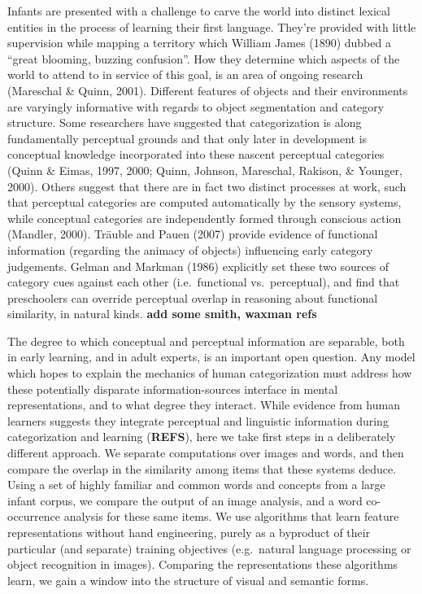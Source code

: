 \documentclass[10pt, letterpaper]{article}
\begin{document}
Infants are presented with a challenge to carve the world into distinct
lexical entities in the process of learning their first language.
They're provided with little supervision while mapping a territory which
William James (1890) dubbed a ``great blooming, buzzing confusion''. How
they determine which aspects of the world to attend to in service of
this goal, is an area of ongoing research (Mareschal \& Quinn, 2001).
Different features of objects and their environments are varyingly
informative with regards to object segmentation and category structure.
Some researchers have suggested that categorization is along
fundamentally perceptual grounds and that only later in development is
conceptual knowledge incorporated into these nascent perceptual
categories (Quinn \& Eimas, 1997, 2000; Quinn, Johnson, Mareschal,
Rakison, \& Younger, 2000). Others suggest that there are in fact two
distinct processes at work, such that perceptual categories are computed
automatically by the sensory systems, while conceptual categories are
independently formed through conscious action (Mandler, 2000). Träuble
and Pauen (2007) provide evidence of functional information (regarding
the animacy of objects) influencing early category judgements. Gelman
and Markman (1986) explicitly set these two sources of category cues
against each other (i.e.~functional vs.~perceptual), and find that
preschoolers can override perceptual overlap in reasoning about
functional similarity, in natural kinds. \textbf{add some smith, waxman
refs}

The degree to which conceptual and perceptual information are separable,
both in early learning, and in adult experts, is an important open
question. Any model which hopes to explain the mechanics of human
categorization must address how these potentially disparate
information-sources interface in mental representations, and to what
degree they interact. While evidence from human learners suggests they
integrate perceptual and linguistic information during categorization
and learning (\textbf{REFS}), here we take first steps in a deliberately
different approach. We separate computations over images and words, and
then compare the overlap in the similarity among items that these
systems deduce. Using a set of highly familiar and common words and
concepts from a large infant corpus, we compare the output of an image
analysis, and a word co-occurrence analysis for these same items. We use
algorithms that learn feature representations without hand engineering,
purely as a byproduct of their particular (and separate) training
objectives (e.g.~natural language processing or object recognition in
images). Comparing the representations these algorithms learn, we gain a
window into the structure of visual and semantic forms.
\end{document}
